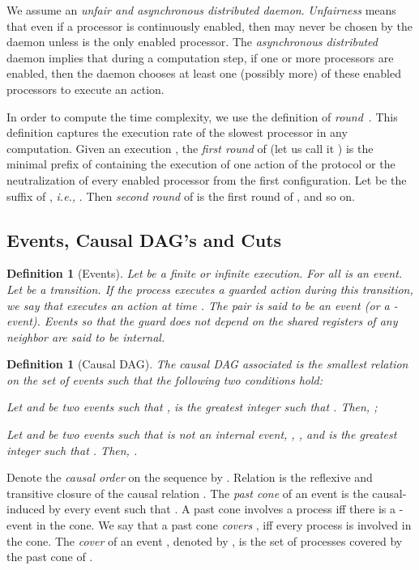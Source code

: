 \documentclass[11pt]{article}
\newtheorem{definition}[theorem]{Definition}
\newcommand{\BEGLIST}{\begin{list}{}{\partopsep -2pt \parsep -2pt \listparindent 0pt}}\newcommand{\ENDLIST}{\end{list}}
\newcommand{\ie}{\emph{i.e., }}
\begin{document}
We assume an \emph{unfair and asynchronous distributed daemon}. 
\emph{Unfairness} means that even if a 
processor  is continuously enabled, then  may never be chosen by 
the daemon unless  is the only enabled processor.
The \emph{asynchronous distributed} daemon implies that 
during a computation step, if one or more processors are enabled, then the 
daemon chooses at least one (possibly more) of these enabled processors to 
execute an action.



In order to compute the time complexity, we use the definition of
\emph{round}~\cite{DIM97a}.  This definition captures the execution rate of 
the slowest processor in any computation.
Given an execution , the \emph{first round} of  
(let us call it )
is the minimal prefix of  containing the execution of one action 
of the protocol or the neutralization of every enabled processor from the first configuration.  
Let  be the suffix of , \ie .  
Then \emph{second round} of  is the first round of , and so on.

\subsection{Events, Causal DAG's and Cuts}

\begin{definition}[Events] 
Let  be a finite or
infinite execution. 
 For all  is an event.
  Let  be a transition. If the
process  executes a guarded action during this transition, we say that 
executes an action at time .  The pair  is said to be an
event (or a -event). 
Events so that the guard does not depend on the shared registers of any neighbor are said to be \emph{internal}.
\end{definition}

\begin{definition}[Causal DAG]
The causal DAG associated is the smallest relation  on the set of events
such that the following two conditions hold:
\BEGLIST
\item [1.] Let  and  be two events such that ,  is 
the greatest integer such that . Then,
;

\item [2.] 
Let  and  be two events such that  is not an internal event, , , and  is 
the greatest integer such that .  Then, 
.
\ENDLIST
\end{definition}

Denote the \emph{causal order} on the sequence  by .  Relation  is 
the reflexive and transitive closure of the causal
relation .
The \emph{past cone} of an event  is the  causal- induced
by every event  such that . 
A past cone involves a process  iff there is a -event in the cone.  We say that a past 
cone \emph{covers} , iff every process  is involved in the cone. The \emph{cover} of an 
event , denoted by , is the set of processes  covered by the past cone of . 
\end{document}
